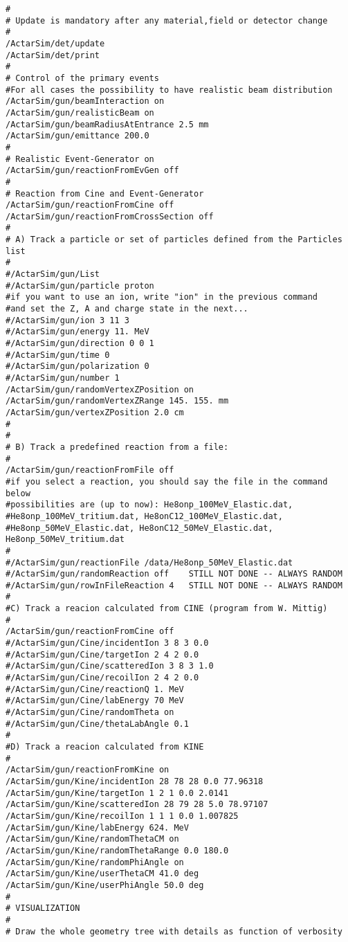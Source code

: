 \begin{verbatim}
#
# Update is mandatory after any material,field or detector change
#
/ActarSim/det/update
/ActarSim/det/print
#
# Control of the primary events
#For all cases the possibility to have realistic beam distribution
/ActarSim/gun/beamInteraction on
/ActarSim/gun/realisticBeam on
/ActarSim/gun/beamRadiusAtEntrance 2.5 mm
/ActarSim/gun/emittance 200.0
#
# Realistic Event-Generator on
/ActarSim/gun/reactionFromEvGen off
#
# Reaction from Cine and Event-Generator
/ActarSim/gun/reactionFromCine off
/ActarSim/gun/reactionFromCrossSection off
#
# A) Track a particle or set of particles defined from the Particles list
#
#/ActarSim/gun/List
#/ActarSim/gun/particle proton
#if you want to use an ion, write "ion" in the previous command
#and set the Z, A and charge state in the next...
#/ActarSim/gun/ion 3 11 3
#/ActarSim/gun/energy 11. MeV
#/ActarSim/gun/direction 0 0 1
#/ActarSim/gun/time 0
#/ActarSim/gun/polarization 0
#/ActarSim/gun/number 1
/ActarSim/gun/randomVertexZPosition on
/ActarSim/gun/randomVertexZRange 145. 155. mm
/ActarSim/gun/vertexZPosition 2.0 cm
#
#
# B) Track a predefined reaction from a file:
#
/ActarSim/gun/reactionFromFile off
#if you select a reaction, you should say the file in the command below
#possibilities are (up to now): He8onp_100MeV_Elastic.dat,
#He8onp_100MeV_tritium.dat, He8onC12_100MeV_Elastic.dat,
#He8onp_50MeV_Elastic.dat, He8onC12_50MeV_Elastic.dat, He8onp_50MeV_tritium.dat
#
#/ActarSim/gun/reactionFile /data/He8onp_50MeV_Elastic.dat
#/ActarSim/gun/randomReaction off    STILL NOT DONE -- ALWAYS RANDOM
#/ActarSim/gun/rowInFileReaction 4   STILL NOT DONE -- ALWAYS RANDOM
#
#C) Track a reacion calculated from CINE (program from W. Mittig)
#
/ActarSim/gun/reactionFromCine off
#/ActarSim/gun/Cine/incidentIon 3 8 3 0.0
#/ActarSim/gun/Cine/targetIon 2 4 2 0.0
#/ActarSim/gun/Cine/scatteredIon 3 8 3 1.0
#/ActarSim/gun/Cine/recoilIon 2 4 2 0.0
#/ActarSim/gun/Cine/reactionQ 1. MeV
#/ActarSim/gun/Cine/labEnergy 70 MeV
#/ActarSim/gun/Cine/randomTheta on
#/ActarSim/gun/Cine/thetaLabAngle 0.1
#
#D) Track a reacion calculated from KINE
#
/ActarSim/gun/reactionFromKine on
/ActarSim/gun/Kine/incidentIon 28 78 28 0.0 77.96318
/ActarSim/gun/Kine/targetIon 1 2 1 0.0 2.0141
/ActarSim/gun/Kine/scatteredIon 28 79 28 5.0 78.97107
/ActarSim/gun/Kine/recoilIon 1 1 1 0.0 1.007825
/ActarSim/gun/Kine/labEnergy 624. MeV
/ActarSim/gun/Kine/randomThetaCM on
/ActarSim/gun/Kine/randomThetaRange 0.0 180.0
/ActarSim/gun/Kine/randomPhiAngle on
/ActarSim/gun/Kine/userThetaCM 41.0 deg
/ActarSim/gun/Kine/userPhiAngle 50.0 deg
#
# VISUALIZATION
#
# Draw the whole geometry tree with details as function of verbosity

\end{verbatim}
